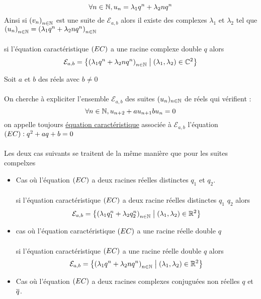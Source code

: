 \begin{dem}
\begin{itemize}
        \[\forall n \in \mathbb{N}, u_n = \lambda_1q^n + \lambda_2 n q^n\]
        Ainsi si \(\left(v_n\right)_{n\in \mathbb{N}}\) est une suite de \(\mathcal{E}_{a,b}\) alors il existe des complexes \(\lambda_1\) et \(\lambda_2\) tel que \(\left(u_n\right)_{n \in \mathbb{N}} = \left( \lambda_1 q^n + \lambda_2 n q^n\right)_{n \in \mathbb{N}}\)\\~\\
        \conclusion si l'équation caractéristique \(\left(EC\right)\) a une racine complexe double \(q\) alors 
        \[\mathcal{E}_{a,b} = \left\lbrace\left(\lambda_1q^n + \lambda_2 n q^n\right)_{n \in \mathbb{N}}\;\middle|\; \left(\lambda_1,\lambda_2\right)\in \mathbb{C}^2\right\rbrace\]
    \end{itemize}
\end{dem}

\begin{dem}
     Soit \(a\) et \(b\) des réels avec \(b\neq 0\)\\~\\
    On cherche à expliciter l'ensemble \(\mathcal{E}_{a,b}\) des suites \((u_n)_{n\in \mathbb{N}}\) de réels qui vérifient : 
    \[\forall n \in \mathbb{N}, u_{n+2} + a u_{n+1} b u_n = 0\]
    on appelle toujours \underline{équation caractéristique} associée à \(\mathcal{E}_{a,b}\) l'équation \(\left(EC\right) : q^2 +aq+b=0\)\\~\\
    Les deux cas suivants se traitent de la même manière que pour les suites compelxes 
    \begin{itemize}
        \item Cas où l'équation \(\left(EC\right)\) a deux racines réelles distinctes \(q_1\) et \(q_2\).\\~\\
        \conclusion si l'équation caractéristique \(\left(EC\right)\) a deux racine réelles distinctes \(q_1\) \(q_2\) alors 
        \[\mathcal{E}_{a,b} = \left\lbrace\left(\lambda_1q_1^n + \lambda_2q_2^n\right)_{n \in \mathbb{N}} \;\middle|\; \left(\lambda_1,\lambda_2\right) \in \mathbb{R}^2\right\rbrace\]
        \item cas où l'équation caractéristique \(\left(EC\right)\) a une racine réelle double \(q\) \\~\\
        \conclusion si l'équation caractéristique \(\left(EC\right)\) a une racine réelle double \(q\) alors 
        \[\mathcal{E}_{a,b} = \left\lbrace\left(\lambda_1q^n + \lambda_2 n q^n\right)_{n \in \mathbb{N}}\;\middle|\; \left(\lambda_1,\lambda_2\right)\in \mathbb{R}^2\right\rbrace\]
        \item Cas où l'équation \(\left(EC\right)\) a deux racines complexes conjuguées non réelles \(q\) et \(\overline{q}\).\\~\\

\end{itemize}
\end{dem}
